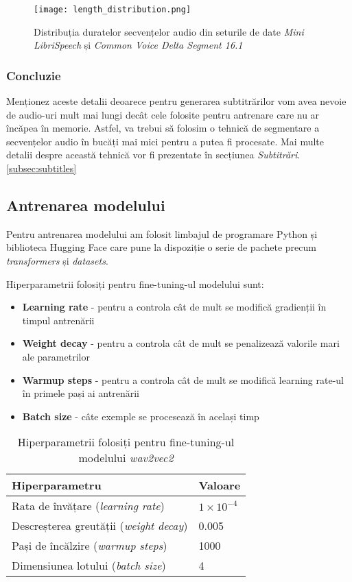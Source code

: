 \begin{figure}[h]
    \centering
    \texttt{[image: length\_distribution.png]}
    \caption{Distribuția duratelor secvențelor audio din seturile de date \textit{Mini LibriSpeech} și \textit{Common Voice Delta Segment 16.1}}
    \label{fig:length-distribution}
\end{figure}

\subsubsection{Concluzie}
Menționez aceste detalii deoarece pentru generarea subtitrărilor vom avea nevoie de audio-uri
mult mai lungi decât cele folosite pentru antrenare care nu ar încăpea în memorie. Astfel, va trebui
să folosim o tehnică de segmentare a secvențelor audio în bucăți mai mici pentru a putea fi procesate.
Mai multe detalii despre această tehnică vor fi prezentate în secțiunea \textit{Subtitrări}. \ref{subsec:subtitles}

\subsection{Antrenarea modelului}
Pentru antrenarea modelului am folosit limbajul de programare Python și biblioteca Hugging Face
care pune la dispoziție o serie de pachete precum \textit{transformers} și \textit{datasets}.
\par
Hiperparametrii folosiți pentru fine-tuning-ul modelului sunt:
\begin{itemize}
    \item \textbf{Learning rate} - pentru a controla cât de mult se modifică gradienții în timpul
    antrenării 
    \item \textbf{Weight decay} - pentru a controla cât de mult se penalizează valorile mari ale
    parametrilor 
    \item \textbf{Warmup steps} - pentru a controla cât de mult se modifică learning rate-ul în
    primele pași ai antrenării
    \item \textbf{Batch size} - câte exemple se procesează în același timp
\end{itemize}

\vspace{0.5em}

\begin{table}[h]
    \centering
    \label{tab:wav2vec2-hyperparameters}
    \begin{tabular}{ll}
    \hline
    \textbf{Hiperparametru} & \textbf{Valoare} \\ \hline
    Rata de învățare (\textit{learning rate}) & $1 \times 10^{-4}$ \\
    Descreșterea greutății (\textit{weight decay}) & 0.005 \\
    Pași de încălzire (\textit{warmup steps}) & 1000 \\
    Dimensiunea lotului (\textit{batch size}) & 4 \\ \hline
    \end{tabular}
    \caption{Hiperparametrii folosiți pentru fine-tuning-ul modelului \textit{wav2vec2}}
\end{table}

